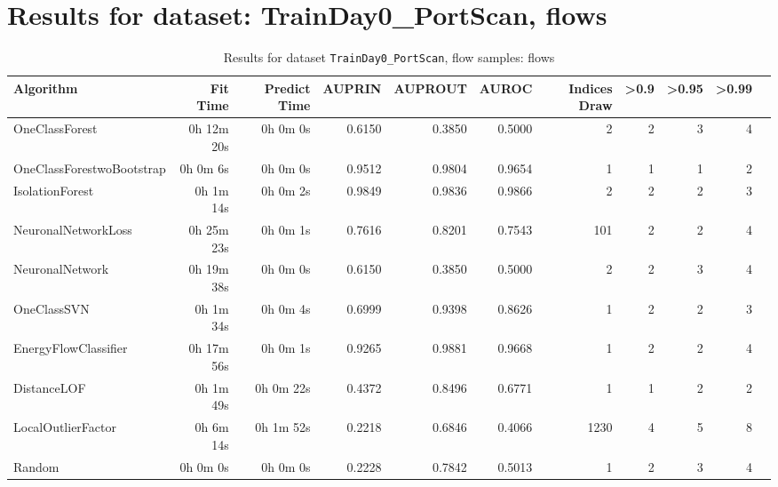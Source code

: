 \documentclass{article}
\begin{document}
\section*{Results for dataset: TrainDay0_PortScan, flows}
\begin{table}[h!]
\centering
\caption{Results for dataset \texttt{TrainDay0_PortScan}, flow samples: flows}
\label{tab:trainday0portscan_flows}
\begin{tabular}{lrrrrrrrrrr}
\toprule
Algorithm & Fit Time & Predict Time & AUPRIN & AUPROUT & AUROC & Indices Draw & >0.9 & >0.95 & >0.99 \\
\midrule
OneClassForest & 0h 12m 20s & 0h 0m 0s & 0.6150 & 0.3850 & 0.5000 & 2 & 2 & 3 & 4 \\
OneClassForestwoBootstrap & 0h 0m 6s & 0h 0m 0s & 0.9512 & 0.9804 & 0.9654 & 1 & 1 & 1 & 2 \\
IsolationForest & 0h 1m 14s & 0h 0m 2s & 0.9849 & 0.9836 & 0.9866 & 2 & 2 & 2 & 3 \\
NeuronalNetworkLoss & 0h 25m 23s & 0h 0m 1s & 0.7616 & 0.8201 & 0.7543 & 101 & 2 & 2 & 4 \\
NeuronalNetwork & 0h 19m 38s & 0h 0m 0s & 0.6150 & 0.3850 & 0.5000 & 2 & 2 & 3 & 4 \\
OneClassSVN & 0h 1m 34s & 0h 0m 4s & 0.6999 & 0.9398 & 0.8626 & 1 & 2 & 2 & 3 \\
EnergyFlowClassifier & 0h 17m 56s & 0h 0m 1s & 0.9265 & 0.9881 & 0.9668 & 1 & 2 & 2 & 4 \\
DistanceLOF & 0h 1m 49s & 0h 0m 22s & 0.4372 & 0.8496 & 0.6771 & 1 & 1 & 2 & 2 \\
LocalOutlierFactor & 0h 6m 14s & 0h 1m 52s & 0.2218 & 0.6846 & 0.4066 & 1230 & 4 & 5 & 8 \\
Random & 0h 0m 0s & 0h 0m 0s & 0.2228 & 0.7842 & 0.5013 & 1 & 2 & 3 & 4 \\
\bottomrule
\end{tabular}
\end{table}
\end{document}
